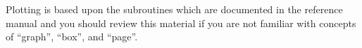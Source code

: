 
Plotting is based upon the  subroutines which are
documented in the \bmad reference manual and you should review this
material if you are not familiar with concepts of ``graph'', ``box'',
and ``page''. 


